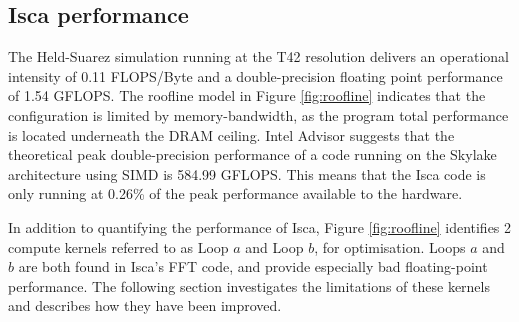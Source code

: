 \documentclass[a4paper,11pt]{report}
\begin{document}
\subsection{Isca performance}
The Held-Suarez simulation running at the T42 resolution delivers an operational intensity of 0.11 FLOPS/Byte and a double-precision floating point performance of 1.54 GFLOPS. The roofline model in Figure \ref{fig:roofline} indicates that the configuration is limited by memory-bandwidth, as the program total performance is located underneath the DRAM ceiling. Intel Advisor suggests that the theoretical peak double-precision performance of a code running on the Skylake architecture using SIMD is 584.99 GFLOPS. This means that the Isca code is only running at 0.26\% of the peak performance available to the hardware.
\par
In addition to quantifying the performance of Isca, Figure \ref{fig:roofline} identifies 2 compute kernels referred to as Loop $a$ and Loop $b$, for optimisation. Loops $a$ and $b$ are both found in Isca's FFT code, and provide especially bad floating-point performance. The following section investigates the limitations of these kernels and describes how they have been improved.


\end{document}
